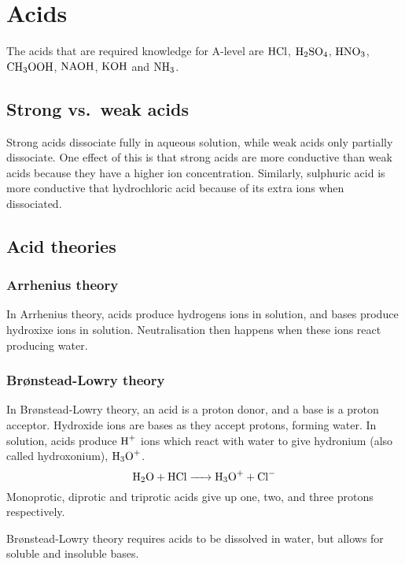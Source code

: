 \section{Acids}
The acids that are required knowledge for A-level are $\ce{HCl}$, $\ce{H2SO4}$, $\ce{HNO3}$, $\ce{CH3OOH}$, $\ce{NAOH}$, $\ce{KOH}$ and $\ce{NH3}$.

\subsection{Strong vs.\ weak acids}
Strong acids dissociate fully in aqueous solution, while weak acids only partially dissociate. One effect of this is that strong acids are more conductive than weak acids because they have a higher ion concentration. Similarly, sulphuric acid is more conductive that hydrochloric acid because of its extra ions when dissociated.

\subsection{Acid theories}
\subsubsection{Arrhenius theory}
In Arrhenius theory, acids produce hydrogens ions in solution, and bases produce hydroxixe ions in solution. Neutralisation then happens when these ions react producing water.

\subsubsection{Brønstead-Lowry theory}
In Brønstead-Lowry theory, an acid is a proton donor, and a base is a proton acceptor. Hydroxide ions are bases as they accept protons, forming water. In solution, acids produce $\ce{H+}$ ions which react with water to give hydronium (also called hydroxonium), $\ce{H3O+}$.
\begin{equation}
	\ce{H2O + HCl -> H3O+ + Cl-}
\end{equation}
Monoprotic, diprotic and triprotic acids give up one, two, and three protons respectively.

Brønstead-Lowry theory requires acids to be dissolved in water, but allows for soluble and insoluble bases.

